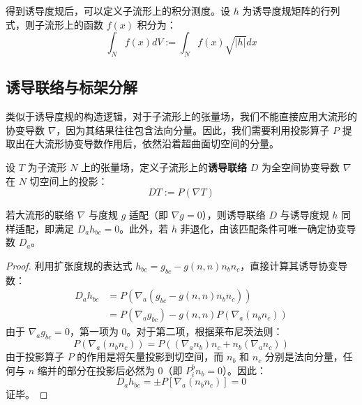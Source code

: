 得到诱导度规后，可以定义子流形上的积分测度。设 $h$ 为诱导度规矩阵的行列式，则子流形上的函数 $f(x)$ 积分为：
\begin{equation}
    \int_N f(x) dV := \int_N f(x) \sqrt{|h|} dx
\end{equation}

\subsection{诱导联络与标架分解}

类似于诱导度规的构造逻辑，对于子流形上的张量场，我们不能直接应用大流形的协变导数 $\nabla$，因为其结果往往包含法向分量。因此，我们需要利用投影算子 $P$ 提取出在大流形协变导数作用后，依然沿着超曲面切空间的分量。

\begin{definition}[诱导联络]
    设 $T$ 为子流形 $N$ 上的张量场，定义子流形上的\textbf{诱导联络} $D$ 为全空间协变导数 $\nabla$ 在 $N$ 切空间上的投影：
    \begin{equation}
        D T := P(\nabla T)
    \end{equation}
\end{definition}

\begin{theorem}[度规适配性与唯一性]
    若大流形的联络 $\nabla$ 与度规 $g$ 适配（即 $\nabla g = 0$），则诱导联络 $D$ 与诱导度规 $h$ 同样适配，即满足 $D_a h_{bc} = 0$。此外，若 $h$ 非退化，由该匹配条件可唯一确定协变导数 $D_a$。
\end{theorem}

\begin{proof}
    利用扩张度规的表达式 $h_{bc} = g_{bc} - g(n,n)n_b n_c$，直接计算其诱导协变导数：
    \begin{align*}
        D_a h_{bc} &= P(\nabla_a (g_{bc} - g(n,n)n_b n_c)) \\
        &= P(\nabla_a g_{bc}) - g(n,n) P(\nabla_a (n_b n_c))
    \end{align*}
    由于 $\nabla_a g_{bc} = 0$，第一项为 0。对于第二项，根据莱布尼茨法则：
    \begin{equation*}
        P(\nabla_a (n_b n_c)) = P((\nabla_a n_b) n_c + n_b (\nabla_a n_c))
    \end{equation*}
    由于投影算子 $P$ 的作用是将矢量投影到切空间，而 $n_b$ 和 $n_c$ 分别是法向分量，任何与 $n$ 缩并的部分在投影后必然为 0（即 $P^b_i n_b = 0$）。因此：
    \begin{equation}
        D_a h_{bc} = \pm P[\nabla_a (n_b n_c)] = 0
    \end{equation}
    证毕。
\end{proof}

